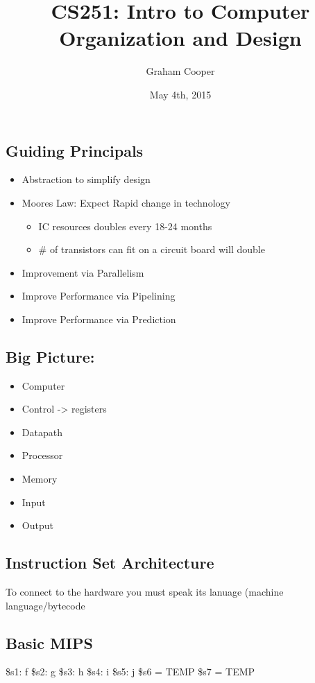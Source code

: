 \documentclass[12pt]{article}
\title{\vspace{-15ex}CS251: Intro to Computer Organization and Design\vspace{-1ex}}
\date{May 4th, 2015}
\author{Graham Cooper}
\begin{document}
	\maketitle
	
	\subsection*{Guiding Principals}
	\begin{itemize}
		\item Abstraction to simplify design
		\item Moores Law: Expect Rapid change in technology
		\begin{itemize}
			\item IC resources doubles every 18-24 months
			\item \# of transistors can fit on a circuit board will double
		\end{itemize}
		\item Improvement via Parallelism
		\item Improve Performance via Pipelining
		\item Improve Performance via Prediction
	\end{itemize}
	
	\subsection*{Big Picture:}
	\begin{itemize}
		\item Computer
		\item Control -> registers
		\item Datapath
		\item Processor
		\item Memory
		\item Input
		\item Output
	\end{itemize}{}
	
	\subsection*{Instruction Set Architecture}
	To connect to the hardware you must speak its lanuage (machine language/bytecode\\
	
	\subsection*{Basic MIPS}
	\$s1: f \$s2: g \$s3: h \$s4: i \$s5: j \$s6 = TEMP \$s7 = TEMP\\
	
\end{document}
